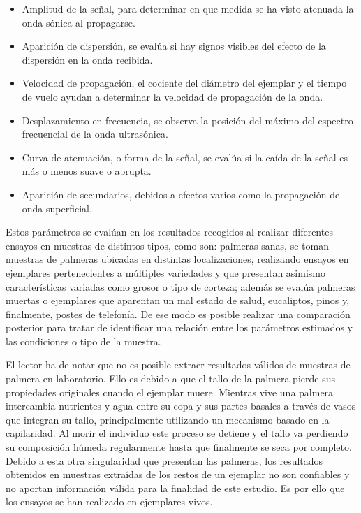 \begin{itemize}
    \item Amplitud de la señal, para determinar en que medida se ha visto
	atenuada la onda sónica al propagarse.
    \item Aparición de dispersión, se evalúa si hay signos visibles del
	efecto de la dispersión en la onda recibida.
    \item Velocidad de propagación, el cociente del diámetro del ejemplar y
	el tiempo de vuelo ayudan a determinar la velocidad de propagación
	de la onda.
    \item Desplazamiento en frecuencia, se observa la posición del máximo
	del espectro frecuencial de la onda ultrasónica.
    \item Curva de atenuación, o forma de la señal, se evalúa si la caída
	de la señal es más o menos suave o abrupta.
    \item Aparición de secundarios, debidos a efectos varios como la
	propagación de onda superficial.
\end{itemize}

Estos parámetros se evalúan en los resultados recogidos al realizar
diferentes ensayos en muestras de distintos tipos, como son: palmeras
sanas, se toman muestras de palmeras ubicadas en distintas localizaciones,
realizando ensayos en ejemplares pertenecientes a múltiples variedades y
que presentan asimismo características variadas como grosor o tipo de
corteza; además se evalúa palmeras muertas o ejemplares que aparentan un
mal estado de salud, eucaliptos, pinos y, finalmente, postes de telefonía.
De ese modo es posible realizar una comparación posterior para tratar de
identificar una relación entre los parámetros estimados y las condiciones o
tipo de la muestra.

El lector ha de notar que no es posible extraer resultados válidos de
muestras de palmera en laboratorio. Ello es debido a que el tallo de la
palmera pierde sus propiedades originales cuando el ejemplar muere.
Mientras vive una palmera intercambia nutrientes y agua entre su copa y sus
partes basales a través de vasos que integran su tallo, principalmente
utilizando un mecanismo basado en la capilaridad. Al morir el individuo
este proceso se detiene y el tallo va perdiendo su composición húmeda
regularmente hasta que finalmente se seca por completo. Debido a esta otra
singularidad que presentan las palmeras, los resultados obtenidos en
muestras extraídas de los restos de un ejemplar no son confiables y no
aportan información válida para la finalidad de este estudio. Es por ello
que los ensayos se han realizado en ejemplares vivos.

